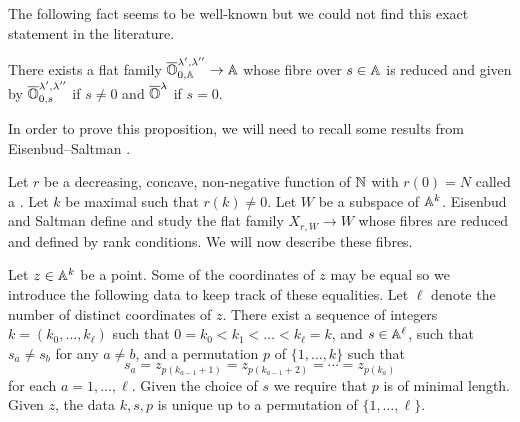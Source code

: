 \documentclass[draft]{article} %
\begin{document}
The following fact seems to be well-known but we could not find this exact statement in the literature.
\begin{proposition} 
    \label{prop:adjoint}
    There exists a flat family $\overline{\OO}^{\lambda', \lambda''}_{0,\AA} \rightarrow \AA$ whose fibre over $s \in \AA$ is reduced and given by $\overline{\OO}^{\lambda', \lambda''}_{0,s}$ if $s \ne 0 $ and $\overline{\OO}^\lambda $ if $ s = 0$.
\end{proposition}
% 
In order to prove this proposition, we will need to recall some results from Eisenbud--Saltman \cite{eisenbud1989rank}. 
% 

Let $ r $ be a decreasing, concave, non-negative function of $\NN$ with $r(0) = N$ called a .  Let $k $ be maximal such that $ r(k) \ne 0 $.
% 
Let $ W$ be a subspace of $ \AA^k$. Eisenbud and Saltman define and study the flat family $ X_{r,W} \rightarrow W$ whose fibres are reduced and defined by rank conditions. We will now describe these fibres. 

Let $ z \in \AA^k$ be a point. Some of the coordinates of $z$ may be equal so we introduce the following data to keep track of these equalities. Let $ \ell$ denote the number of distinct coordinates of $ z $. There exist a sequence of integers $k = (k_0,\dots,k_\ell)$ such that $ 0=k_0< k_1< \dots < k_\ell = k $, and $ s \in\AA^\ell$, such that $s_a\ne s_b$ for any $a\ne b$, and a permutation  $ p $ of $ \{1, \dots, k\}$ such that 
$$ 
    s_a = z_{p(k_{a-1}+1)} = z_{p(k_{a-1} + 2)} =  \cdots = z_{p(k_a)}
$$ 
for each $a = 1,\dots,\ell$. 
Given the choice of $ s$ we require that $ p $ is of minimal length. 
Given $z$, the data $k, s, p$ is unique up to a permutation of $ \{1, \dots, \ell\}$.
% 
% 
\end{document}
